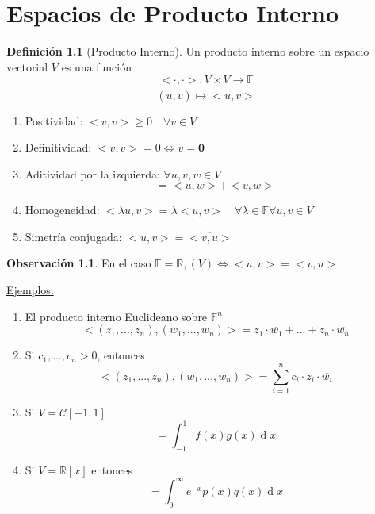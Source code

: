 \documentclass[11pt]{book}
\renewcommand{\d}[1]{\ensuremath{\operatorname{d}\!{#1}}}
\renewcommand{\vec}[1]{\mathbf{#1}}
\newcommand{\set}[1]{\mathbb{#1}}
\newcommand{\func}[5]{#1:#2\xrightarrow[#5]{#4}#3}
\theoremstyle{definition}
\newtheorem{defn}{Definición}[section]
\newtheorem{obs}{Observación}[section]
\begin{document}
\chapter{Espacios de Producto Interno}
\begin{defn}[Producto Interno]
	Un producto interno sobre un espacio vectorial $V$ es una función
	\[\func{<\cdot,\cdot>}{V\times V}{\set{F}}{}{}\]
	\[(u,v)\mapsto <u,v>\]
	\begin{enumerate}[label=\roman*)]
		\item Positividad: $<v,v>\geq 0\quad\forall v\in V$

		\item Definitividad: $<v,v>=0\iff v=\vec{0}$

		\item Aditividad por la izquierda: $\forall u,v,w\in V$
		\[<u+v,w>=<u,w>+<v,w>\]

		\item Homogeneidad: $<\lambda u,v>=\lambda<u,v>\quad\forall\lambda\in\set{F}\forall u,v\in V$

		\item Simetría conjugada: $<u,v>=\overline{<v,u>}$
	\end{enumerate}
\end{defn}
\begin{obs}
	En el caso $\set{F}=\set{R}, (V)\iff <u,v>=<v,u>$
\end{obs}
\underline{Ejemplos:}
\begin{enumerate}[label=\alph*)]
	\item El producto interno Euclideano sobre $\set{F}^n$
	\[<(z_1,...,z_n),(w_1,...,w_n)>=z_1\cdot \overline{w_1}+...+z_n\cdot \overline{w_n}\]

	\item Si $c_1,...,c_n>0$, entonces
	\[<(z_1,...,z_n),(w_1,...,w_n)>=\sum^n_{i=1}c_i\cdot z_i\cdot \overline{w_i}\]
	
	\item Si $V=\mathcal{C}[-1,1]$
	\[<f,g>=\int^1_{-1}f(x)g(x)\d x\]

	\item Si $V=\set{R}[x]$ entonces
	\[<p,q>=\int_0^\infty e^{-x} p(x)q(x)\d{x}\]
\end{enumerate}
\end{document}
